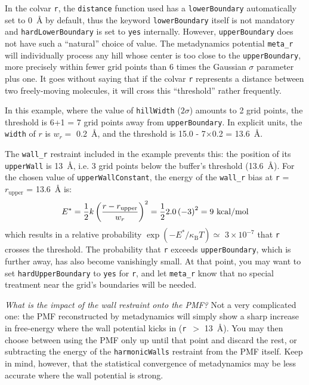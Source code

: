 In the colvar \texttt{r}, the \texttt{distance} function used has a \texttt{lowerBoundary} automatically set to 0~\AA{} by default, thus the keyword \texttt{lowerBoundary} itself is not mandatory and \texttt{hardLowerBoundary} is set to \texttt{yes} internally.
However, \texttt{upperBoundary} does not have such a ``natural'' choice of value.
The metadynamics potential \texttt{meta\_r} will individually process any hill whose center is too close to the \texttt{upperBoundary}, more precisely within fewer grid points than 6 times the Gaussian $\sigma$ parameter plus one.
It goes without saying that if the colvar \texttt{r} represents a distance between two freely-moving molecules, it will cross this ``threshold'' rather frequently.

In this example, where the value of \texttt{hillWidth} ($2\sigma$) amounts to 2 grid points, the threshold is 6+1 = 7 grid points away from \texttt{upperBoundary}.
In explicit units, the \texttt{width} of $r$ is $w_r =$ 0.2~\AA, and the threshold is 15.0 - 7$\times$0.2 = 13.6~\AA.

The \texttt{wall\_r} restraint included in the example prevents this: the position of its \texttt{upperWall} is 13~\AA{}, i.e.{} 3 grid points below the buffer's threshold (13.6~\AA).
For the chosen value of \texttt{upperWallConstant}, the energy of the \texttt{wall\_r} bias at \texttt{r} = $r_{\mathrm{upper}}$ = 13.6~\AA{} is:
\begin{equation*}
  E^* = \frac{1}{2} \- k \left(\frac{r - r_{\mathrm{upper}}}{w_r}\right)^2 = \frac{1}{2} \- 2.0 \left(-3\right)^2 = 9~\mathrm{kcal/mol}
\end{equation*}
which results in a relative probability $\exp(-E^*/\kappa_{\mathrm{B}}T) \simeq$ $3\times{}10^{-7}$ that \texttt{r} crosses the threshold.
The probability that \texttt{r} exceeds \texttt{upperBoundary}, which is further away, has also become vanishingly small.
At that point, you may want to set \texttt{hardUpperBoundary} to \texttt{yes} for \texttt{r}, and let \texttt{meta\_r} know that no special treatment near the grid's boundaries will be needed.

\emph{What is the impact of the wall restraint onto the PMF?} Not a very complicated one: the PMF reconstructed by metadynamics will simply show a sharp increase in free-energy where the wall potential kicks in (\texttt{r}~$>$ 13~\AA{}).
You may then choose between using the PMF only up until that point and discard the rest, or subtracting the energy of the \texttt{harmonicWalls} restraint from the PMF itself.
Keep in mind, however, that the statistical convergence of metadynamics may be less accurate where the wall potential is strong.


